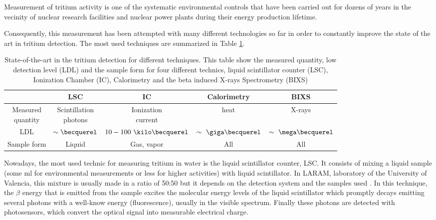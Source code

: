 Measurement of tritium activity is one of the systematic environmental controls that have been carried out for dozens of years in the vecinity of nuclear research facilities and nuclear power plants during their energy production lifetime.

Consequently, this measurement has been attempted with many different technologies so far in order to constantly improve the state of the art in tritium detection. The most used techniques are summarized in Table \ref{tab:DifferentThecnics}.

\begin{table}[htbp]
\begin{center}
\begin{tabular}{|c|c|c|c|c|}
\hline
 & LSC & IC & Calorimetry & BIXS\\
\hline \hline \hline
\parbox{5em}{\centering Measured\\ quantity} & \parbox{5em}{\centering Scintillation\\ photons} &  \parbox{5em}{\centering Ionization\\ current} & heat & X-rays\\ \hline
LDL & $\sim\becquerel$ & $10-100~\kilo\becquerel$ & $\sim~\giga\becquerel$ & $\sim~\mega\becquerel$ \\ \hline
Sample form & Liquid & Gas, vapor & All & All \\ \hline
\end{tabular}
\caption{State-of-the-art in the tritium detection for different techniques. This table show the measured quantity, low detection level (LDL) and the sample form for four different technics, liquid scintillator counter (LSC), Ionization Chamber (IC), Calorimetry and the beta induced X-rays Spectrometry (BIXS)}
\label{tab:DifferentThecnics}
\end{center}
\end{table}

Nowadays, the most used technic for measuring tritium in water is the liquid scintillator counter, LSC. It consists of mixing a liquid sample (some ml for environmental measurements or less for higher activities) with liquid scintillator. In LARAM, laboratory of the University of Valencia, this mixture is usually made in a ratio of 50:50 \cite{LSCLARAM} but it depends on the detection system and the samples used \cite{LSCothers, HofstetterSeveral}. In this technique, the $\beta$ energy that is emitted from the sample excites the molecular energy levels of the liquid scintillator which promptly decays emitting several photons with a well-know energy (fluorescence), usually in the visible spectrum. Finally these photons are detected with photosensors, which convert the optical signal into measurable electrical charge.

